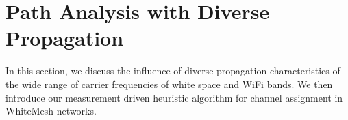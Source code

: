 \section{Path Analysis with Diverse Propagation}
\label{sec:wmalgorithms}


In this section, we discuss the influence of diverse propagation
characteristics of the wide range of carrier frequencies of
white space and WiFi bands. We then introduce our measurement 
driven heuristic algorithm for channel assignment in 
WhiteMesh networks.




